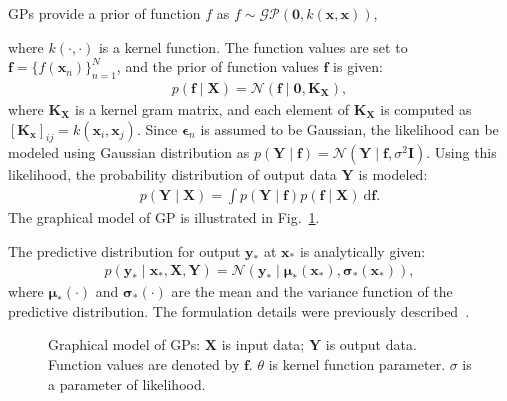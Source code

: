 \documentclass[sn-mathphys-num]{sn-jnl}
\begin{document}
GPs provide a prior of function $f$ as $f \sim \mathcal{GP}(\mathbf{0}, k(\mathbf{x}, \mathbf{x}))$,

where $k(\cdot, \cdot)$ is a kernel function.
The function values are set to $\mathbf{f}=\{f(\mathbf x_n)\}_{n=1}^N$, and the prior of function values $\mathbf f$ is given: 
\begin{align}
    p(\mathbf{f}\mid \mathbf{X}) = \mathcal{N}(\mathbf{f}\mid \mathbf{0}, \mathbf{K_X}),
\end{align}
where $\mathbf{K_X}$ is a kernel gram matrix, and each element of $\mathbf K_{\mathbf X}$ is computed as $[\mathbf{K_x}]_{ij} = k(\mathbf{x}_i, \mathbf{x}_j)$.
Since $\boldsymbol{\epsilon}_n$ is assumed to be Gaussian, the likelihood can be modeled using Gaussian distribution as $p(\mathbf{Y} \mid \mathbf{f}) = \mathcal{N}(\mathbf{Y} \mid \mathbf{f}, \sigma^2 \mathbf{I})$.
Using this likelihood, the probability distribution of output data $\mathbf Y$ is modeled:
\begin{align}\label{eq:gp:model}
    p(\mathbf{Y}\mid \mathbf{X}) =  \int p(\mathbf{Y\mid f})p(\mathbf{f \mid X}) ~ \mathrm d \mathbf f.
\end{align}
The graphical model of GP is illustrated in Fig.~\ref{fig:graphical:GP}.

The predictive distribution for output $\mathbf{y}_{*}$ at $\mathbf{x}_{*}$ is analytically given:
\begin{align}\label{eq:gp:predictive_distribution}
    p(\mathbf{y}_* \mid \mathbf{x}_*, \mathbf{X}, \mathbf{Y}) =\mathcal{N}(\mathbf{y}_* \mid \boldsymbol{\mu}_*(\mathbf x_*),\boldsymbol{\sigma}_*(\mathbf x_*)),
\end{align}
where $\boldsymbol{\mu}_*(\cdot)$ and $\boldsymbol{\sigma}_*(\cdot)$ are the mean and the variance function of the predictive distribution.
The formulation details were previously described~\cite{RasmussenW06}.


\begin{figure}[t]
    \centering
    \centering
    \caption{Graphical model of GPs: $\mathbf{X}$ is input data; $\mathbf{Y}$ is output data. Function values are denoted by $\mathbf{f}$. $\theta$ is kernel function parameter. $\sigma$ is a parameter of likelihood.}
    \label{fig:graphical:GP}
\end{figure}
\end{document}
